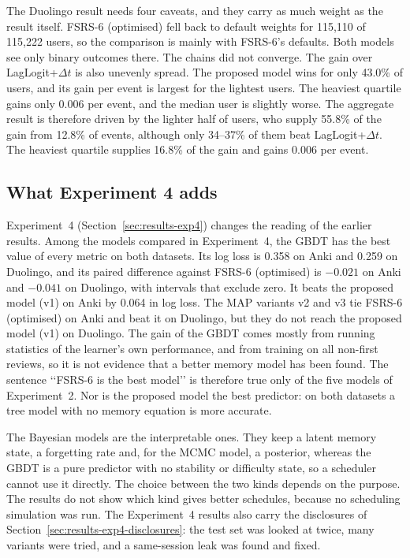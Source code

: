 The Duolingo result needs four caveats, and they carry as much weight as the result itself. FSRS-6 (optimised) fell
back to default weights for 115,110 of 115,222 users, so the comparison is mainly with FSRS-6's defaults. Both models
see only binary outcomes there. The chains did not converge. The gain over LagLogit+$\Delta t$ is also unevenly
spread. The proposed model wins for only 43.0\% of users, and its gain per event is largest for the lightest users.
The heaviest quartile gains only 0.006 per event, and the median user is slightly worse. The aggregate result is therefore driven by the lighter half of users, who supply 55.8\% of the gain from 12.8\% of events, although only 34--37\% of them beat LagLogit+$\Delta t$. The heaviest quartile supplies 16.8\% of the gain and gains 0.006 per event.

\subsection*{What Experiment 4 adds}

Experiment~4 (Section~\ref{sec:results-exp4}) changes the reading of the earlier results. Among the models compared in Experiment~4, the GBDT has the best value of every metric on both datasets. Its log loss is 0.358 on Anki and 0.259 on Duolingo, and its paired difference against FSRS-6 (optimised) is $-0.021$ on Anki and $-0.041$ on Duolingo, with intervals that exclude zero. It beats the proposed model (v1) on Anki by 0.064 in log loss. The MAP variants v2 and v3 tie FSRS-6 (optimised) on Anki and beat it on Duolingo, but they do not reach the proposed model (v1) on Duolingo.
The gain of the GBDT comes mostly from running statistics of the learner's own performance, and from training on all non-first reviews, so it is not evidence that a better memory model has been found. The sentence \lq\lq FSRS-6 is the best model\rq\rq{} is therefore true only of the five models of Experiment~2. Nor is the proposed model the best predictor: on both datasets a tree model with no memory equation is more accurate.

The Bayesian models are the interpretable ones. They keep a latent memory state, a forgetting rate and, for the MCMC model, a posterior, whereas the GBDT is a pure predictor with no stability or difficulty state, so a scheduler cannot use it directly. The choice between the two kinds depends on the purpose. The results do not show which kind gives better schedules, because no scheduling simulation was run. The Experiment~4 results also carry the disclosures of Section~\ref{sec:results-exp4-disclosures}: the test set was looked at twice, many variants were tried, and a same-session leak was found and fixed.

